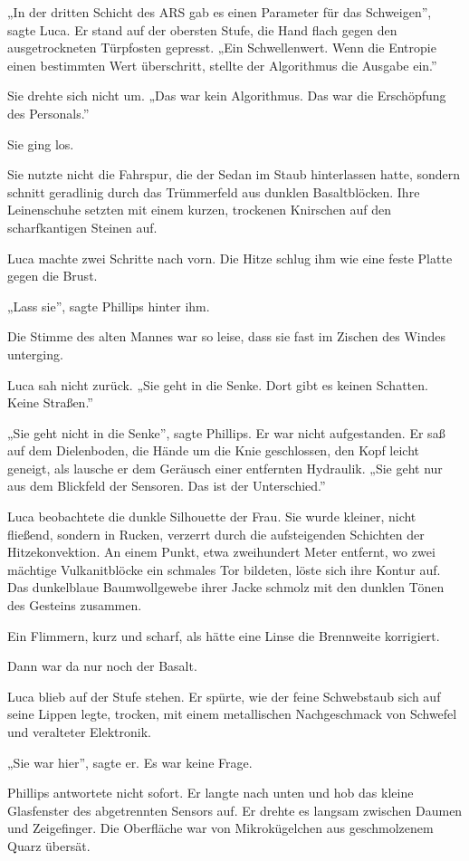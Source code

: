 \documentclass[
  ngerman,
]{article}
\begin{document}
„In der dritten Schicht des ARS gab es einen Parameter für das
Schweigen'', sagte Luca. Er stand auf der obersten Stufe, die Hand flach
gegen den ausgetrockneten Türpfosten gepresst. „Ein Schwellenwert. Wenn
die Entropie einen bestimmten Wert überschritt, stellte der Algorithmus
die Ausgabe ein.''

Sie drehte sich nicht um. „Das war kein Algorithmus. Das war die
Erschöpfung des Personals.''

Sie ging los.

Sie nutzte nicht die Fahrspur, die der Sedan im Staub hinterlassen
hatte, sondern schnitt geradlinig durch das Trümmerfeld aus dunklen
Basaltblöcken. Ihre Leinenschuhe setzten mit einem kurzen, trockenen
Knirschen auf den scharfkantigen Steinen auf.

Luca machte zwei Schritte nach vorn. Die Hitze schlug ihm wie eine feste
Platte gegen die Brust.

„Lass sie'', sagte Phillips hinter ihm.

Die Stimme des alten Mannes war so leise, dass sie fast im Zischen des
Windes unterging.

Luca sah nicht zurück. „Sie geht in die Senke. Dort gibt es keinen
Schatten. Keine Straßen.''

„Sie geht nicht in die Senke'', sagte Phillips. Er war nicht
aufgestanden. Er saß auf dem Dielenboden, die Hände um die Knie
geschlossen, den Kopf leicht geneigt, als lausche er dem Geräusch einer
entfernten Hydraulik. „Sie geht nur aus dem Blickfeld der Sensoren. Das
ist der Unterschied.''

Luca beobachtete die dunkle Silhouette der Frau. Sie wurde kleiner,
nicht fließend, sondern in Rucken, verzerrt durch die aufsteigenden
Schichten der Hitzekonvektion. An einem Punkt, etwa zweihundert Meter
entfernt, wo zwei mächtige Vulkanitblöcke ein schmales Tor bildeten,
löste sich ihre Kontur auf. Das dunkelblaue Baumwollgewebe ihrer Jacke
schmolz mit den dunklen Tönen des Gesteins zusammen.

Ein Flimmern, kurz und scharf, als hätte eine Linse die Brennweite
korrigiert.

Dann war da nur noch der Basalt.

Luca blieb auf der Stufe stehen. Er spürte, wie der feine Schwebstaub
sich auf seine Lippen legte, trocken, mit einem metallischen
Nachgeschmack von Schwefel und veralteter Elektronik.

„Sie war hier'', sagte er. Es war keine Frage.

Phillips antwortete nicht sofort. Er langte nach unten und hob das
kleine Glasfenster des abgetrennten Sensors auf. Er drehte es langsam
zwischen Daumen und Zeigefinger. Die Oberfläche war von Mikrokügelchen
aus geschmolzenem Quarz übersät.
\end{document}

